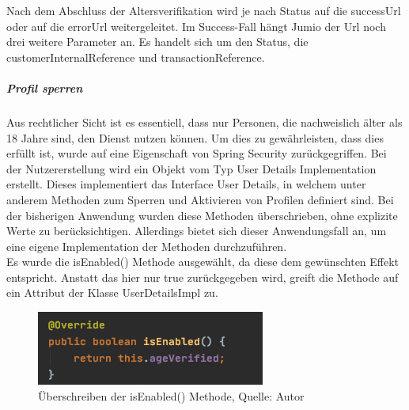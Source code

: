 Nach dem Abschluss der Altersverifikation wird je nach Status auf die successUrl oder auf die errorUrl weitergeleitet. Im Success-Fall hängt Jumio der Url noch drei weitere Parameter an. Es handelt sich um den Status, die customerInternalReference und transactionReference. \\
\newpage
\subparagraph{Profil sperren}
Aus rechtlicher Sicht ist es essentiell, dass nur Personen, die nachweislich älter als 18 Jahre sind, den Dienst nutzen können. Um dies zu gewährleisten, dass dies erfüllt ist, wurde auf eine Eigenschaft von Spring Security zurückgegriffen. Bei der Nutzererstellung wird ein Objekt vom Typ User Details Implementation erstellt. Dieses implementiert das Interface User Details, in welchem unter anderem Methoden zum Sperren und Aktivieren von Profilen definiert sind. Bei der bisherigen Anwendung wurden diese Methoden überschrieben, ohne explizite Werte zu berücksichtigen. Allerdings bietet sich dieser Anwendungsfall an, um eine eigene Implementation der Methoden durchzuführen. \\
Es wurde die \glqq isEnabled()\grqq{} Methode ausgewählt, da diese dem gewünschten Effekt entspricht. Anstatt das hier nur \grqq true\glqq{} zurückgegeben wird, greift die Methode auf ein Attribut der Klasse UserDetailsImpl zu. 
 \begin{figure}[H]
	\centering
	\includegraphics[scale=0.6]{images/methodIsEnabled.PNG}
	\caption[Überschreiben der isEnabled() Methode]{Überschreiben der isEnabled() Methode, Quelle: Autor}
	\label{img: methodIsEnabled}
\end{figure} 

